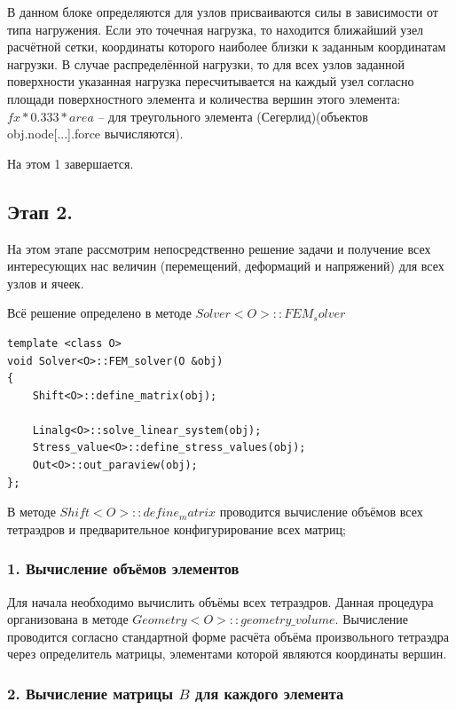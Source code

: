 \documentclass[a4paper,12pt]{article}
\begin{document}
В данном блоке определяются для узлов присваиваются силы в зависимости от типа нагружения. Если это точечная нагрузка, то находится ближайший узел расчётной сетки, координаты которого наиболее близки к заданным координатам нагрузки. В случае распределённой нагрузки, то для всех узлов заданной поверхности указанная нагрузка пересчитывается на каждый узел согласно площади поверхностного элемента и количества вершин этого элемента: $fx*0.333*area$ -- для треугольного элемента (Сегерлид)(объектов obj.node[...].force вычисляются). 


На этом 1 завершается.


\subsection{Этап 2.}
  
	На этом этапе рассмотрим непосредственно решение задачи и получение всех интересующих нас величин (перемещений, деформаций и напряжений) для всех узлов и ячеек.

Всё решение определено в методе $Solver<O>::FEM_solver$  
\begin{scriptsize}
\begin{verbatim}
template <class O> 
void Solver<O>::FEM_solver(O &obj)
{
    Shift<O>::define_matrix(obj);    

    Linalg<O>::solve_linear_system(obj);    
    Stress_value<O>::define_stress_values(obj);
    Out<O>::out_paraview(obj);
};
\end{verbatim}
\end{scriptsize} 


В методе $Shift<O>::define_matrix$ проводится вычисление объёмов всех тетраэдров и предварительное конфигурирование всех матриц;

\subsubsection{1. Вычисление объёмов элементов}
	
	Для начала необходимо вычислить объёмы всех тетраэдров. Данная процедура организована в методе $Geometry<O>::geometry\_volume$. Вычисление проводится согласно стандартной форме расчёта объёма произвольного тетраэдра через определитель матрицы, элементами которой являются координаты вершин.

\subsubsection{2. Вычисление матрицы $B$ для каждого элемента}
	
\end{document}
